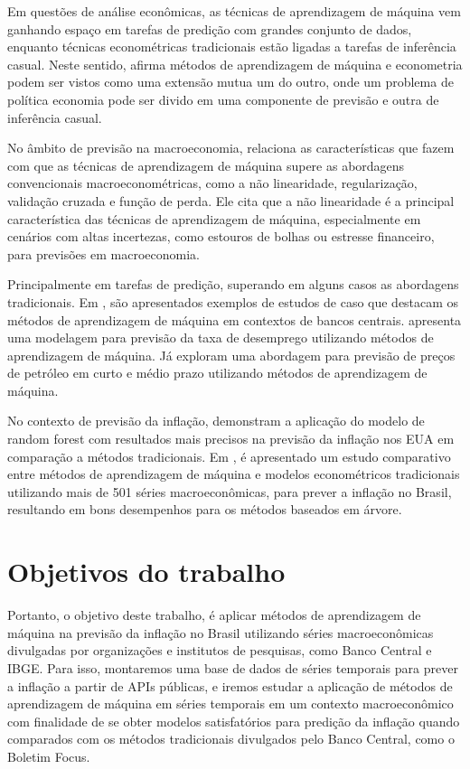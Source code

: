 Em questões de análise econômicas, as técnicas de aprendizagem de máquina vem ganhando espaço em tarefas de predição com grandes conjunto de dados, enquanto técnicas econométricas tradicionais estão ligadas a tarefas de inferência casual. Neste sentido,  afirma métodos de aprendizagem de máquina e econometria podem ser vistos como uma extensão mutua um do outro, onde um problema de política economia pode ser divido em uma componente de previsão e outra de inferência casual.

No âmbito de previsão na macroeconomia,  relaciona as características que fazem com que as técnicas de aprendizagem de máquina supere as abordagens convencionais macroeconométricas, como a não linearidade, regularização, validação cruzada e função de perda. Ele cita que a não linearidade é a principal característica das técnicas de aprendizagem de máquina, especialmente em cenários com altas incertezas, como estouros de bolhas ou estresse financeiro, para previsões em macroeconomia.

Principalmente em tarefas de predição, superando em alguns casos as abordagens tradicionais. Em , são apresentados exemplos de estudos de caso que destacam os métodos de aprendizagem de máquina em contextos de bancos centrais.  apresenta uma modelagem para previsão da taxa de desemprego utilizando métodos de aprendizagem de máquina. Já  exploram uma abordagem para previsão de preços de petróleo em curto e médio prazo utilizando métodos de aprendizagem de máquina.

No contexto de previsão da inflação,  demonstram a aplicação do modelo de random forest com resultados mais precisos na previsão da inflação nos EUA em comparação a métodos tradicionais. Em , é apresentado um estudo comparativo entre métodos de aprendizagem de máquina e modelos econométricos tradicionais utilizando mais de 501 séries macroeconômicas, para prever a inflação no Brasil, resultando em bons desempenhos para os métodos baseados em árvore.

\section{Objetivos do trabalho}\label{sec-objetivos}

Portanto, o objetivo deste trabalho, é aplicar métodos de aprendizagem de máquina na previsão da inflação no Brasil utilizando séries macroeconômicas divulgadas por organizações e institutos de pesquisas, como Banco Central e IBGE. Para isso, montaremos uma base de dados de séries temporais para prever a inflação a partir de APIs públicas, e iremos estudar a aplicação de métodos de aprendizagem de máquina em séries temporais em um contexto macroeconômico com finalidade de se obter modelos satisfatórios para predição da inflação quando comparados com os métodos tradicionais divulgados pelo Banco Central, como o Boletim Focus.

